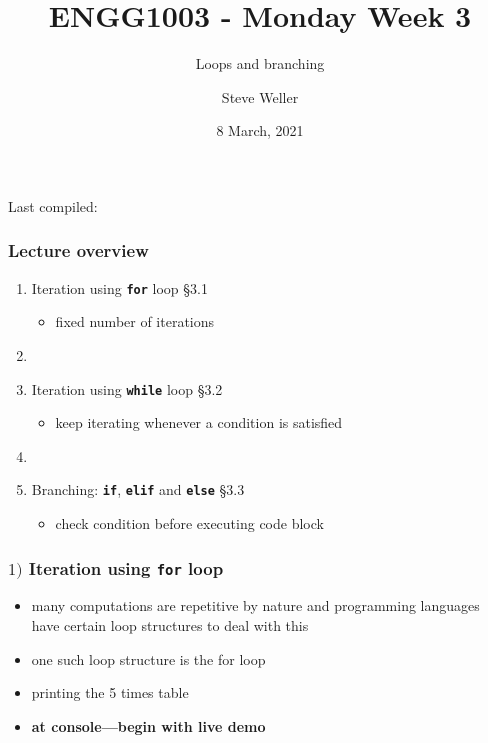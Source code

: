 \documentclass[english,14pt]{beamer}
\title{ENGG1003 - Monday Week 3}
\subtitle{Loops and branching}
\author{Steve Weller}
\institute{University of Newcastle}
\date{8 March, 2021}
\newcommand\red[1]{{\color{red} #1}}
\begin{document}
\begin{flushleft}
{\scriptsize Last compiled:~\DTMnow}
\vspace*{-5mm}
\end{flushleft}
\framebreak


\begin{frame}[fragile]

\frametitle{Lecture overview}
\begin{enumerate}
	\item Iteration using \textbf{\texttt{for}} loop \red{\S3.1}
	\begin{itemize}
		\item fixed number of iterations
	\end{itemize}

	\item[]
	
	\item Iteration using \textbf{\texttt{while}} loop \red{\S3.2}
		\begin{itemize}
			\item keep iterating whenever a condition is satisfied
		\end{itemize}

	\item[]
	
	\item Branching: \textbf{\texttt{if}}, \textbf{\texttt{elif}} and \textbf{\texttt{else}} \red{\S3.3}
		\begin{itemize}
			\item check condition before executing code block
		\end{itemize}
		
\end{enumerate}

\end{frame}


\begin{frame}[fragile]

\frametitle{$1)$ Iteration using \texttt{for} loop}

\begin{itemize}
	\item many computations are repetitive by nature and programming languages have certain loop structures to deal with this
	\item one such loop structure is the for loop
	\item printing the 5 times table
	\item \textbf{at console---begin with live demo}
\end{itemize}


\end{frame}
\end{document}
